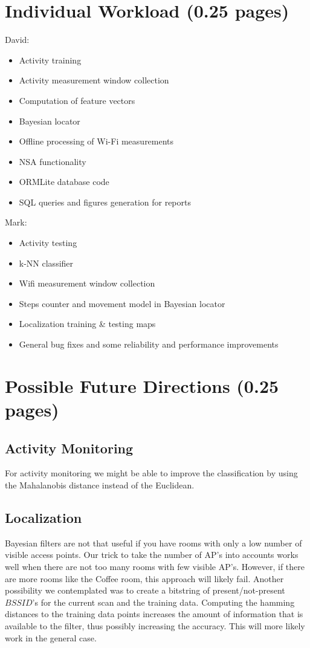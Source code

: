 \documentclass[a4paper,10pt,twoside]{IEEEtran}
\begin{document}
\section{Individual Workload (0.25 pages)}
\label{sec:individual-workload}
David:
\begin{itemize}
    \item Activity training
    \item Activity measurement window collection
    \item Computation of feature vectors
    \item Bayesian locator
    \item Offline processing of Wi-Fi measurements
    \item NSA functionality
    \item ORMLite database code
    \item SQL queries and figures generation for reports
\end{itemize}

Mark:
\begin{itemize}
    \item Activity testing
    \item k-NN classifier
    \item Wifi measurement window collection
    \item Steps counter and movement model in Bayesian locator
    \item Localization training \& testing maps
    \item General bug fixes and some reliability and performance improvements
\end{itemize}

\section{Possible Future Directions (0.25 pages)}
\label{sec:future-directions}
\subsection{Activity Monitoring}
For activity monitoring we might be able to improve the classification by using the Mahalanobis distance instead of the Euclidean.

\subsection{Localization}
Bayesian filters are not that useful if you have rooms with only a low number of visible access points.
Our trick to take the number of AP's into accounts works well when there
are not too many rooms with few visible AP's.
However, if there are more rooms like the Coffee room, this approach will likely fail.
Another possibility we contemplated was to create a bitstring of present/not-present $BSSID$'s for the current scan and the training data.
Computing the hamming distances to the training data points increases the amount of information that
is available to the filter, thus possibly increasing the accuracy.
This will more likely work in the general case.
\end{document}
